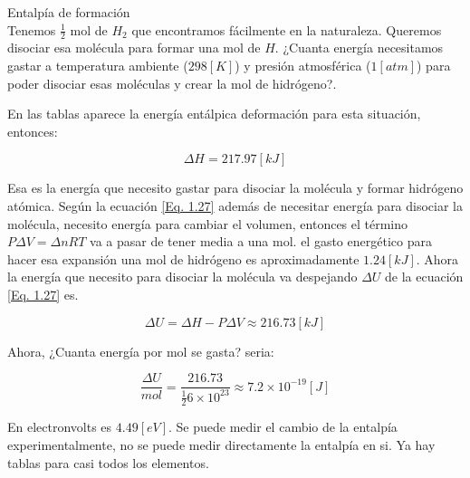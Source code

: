 \documentclass[11pt,fleqn]{book}
\begin{document}
\begin{exercise}
Entalpía de formación\\

Tenemos $\frac{1}{2}$ mol de $H_{2}$ que encontramos fácilmente en la naturaleza. Queremos disociar esa molécula para formar una mol de $H$. ¿Cuanta energía necesitamos gastar a temperatura ambiente ($298 [K]$) y presión atmosférica ($1 [atm]$) para poder disociar esas moléculas y crear la mol de hidrógeno?.

En las tablas aparece la energía entálpica deformación para esta situación, entonces:

\begin{equation*}
    \Delta H=217.97 [kJ]
\end{equation*}

Esa es la energía que necesito gastar para disociar la molécula y formar hidrógeno atómica. Según la ecuación \ref{Eq. 1.27} además de necesitar energía para disociar la molécula, necesito energía para cambiar el volumen, entonces el término $P\Delta V=\Delta nRT$ va a pasar de tener media a una mol. el gasto energético para hacer esa expansión   una mol de hidrógeno es aproximadamente $1.24 [kJ]$. Ahora la energía que necesito para disociar la molécula va despejando $\Delta U$ de la ecuación \ref{Eq. 1.27} es.

\begin{equation*}
    \Delta U=\Delta H-P\Delta V \approx 216.73 [kJ]
\end{equation*}

Ahora, ¿Cuanta energía por mol se gasta? seria:

\begin{equation*}
    \frac{\Delta U}{mol}=\frac{216.73}{\frac{1}{2}6\times10^{23}}\approx7.2\times10^{-19} [J]
\end{equation*}

En electronvolts es $4.49 [eV]$. Se puede medir el cambio de la entalpía experimentalmente, no se puede medir directamente la entalpía en si. Ya hay tablas para casi todos los elementos. 
\end{exercise}
\end{document}
